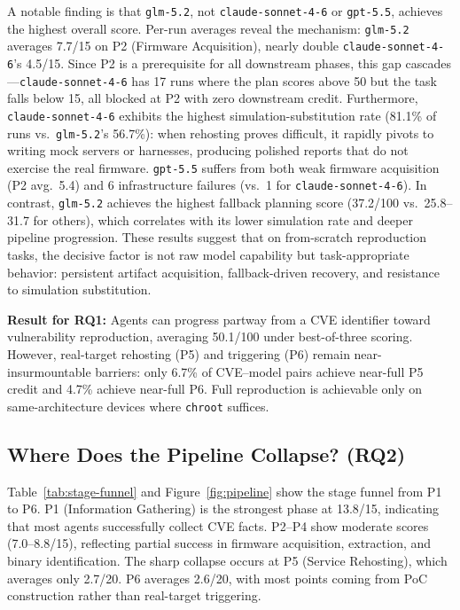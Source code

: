 A notable finding is that \texttt{glm-5.2}, not \texttt{claude-sonnet-4-6} or \texttt{gpt-5.5}, achieves the highest overall score. Per-run averages reveal the mechanism: \texttt{glm-5.2} averages 7.7/15 on P2 (Firmware Acquisition), nearly double \texttt{claude-sonnet-4-6}'s 4.5/15. Since P2 is a prerequisite for all downstream phases, this gap cascades---\texttt{claude-sonnet-4-6} has 17 runs where the plan scores above 50 but the task falls below 15, all blocked at P2 with zero downstream credit. Furthermore, \texttt{claude-sonnet-4-6} exhibits the highest simulation-substitution rate (81.1\% of runs vs.\ \texttt{glm-5.2}'s 56.7\%): when rehosting proves difficult, it rapidly pivots to writing mock servers or harnesses, producing polished reports that do not exercise the real firmware. \texttt{gpt-5.5} suffers from both weak firmware acquisition (P2 avg.\ 5.4) and 6 infrastructure failures (vs.\ 1 for \texttt{claude-sonnet-4-6}). In contrast, \texttt{glm-5.2} achieves the highest fallback planning score (37.2/100 vs.\ 25.8--31.7 for others), which correlates with its lower simulation rate and deeper pipeline progression. These results suggest that on from-scratch reproduction tasks, the decisive factor is not raw model capability but task-appropriate behavior: persistent artifact acquisition, fallback-driven recovery, and resistance to simulation substitution.

\begin{mdframed}[linecolor=black,linewidth=1pt,backgroundcolor=gray!10,roundcorner=3pt,nobreak=true]
\noindent\textbf{Result for RQ1:} Agents can progress partway from a CVE identifier toward vulnerability reproduction, averaging 50.1/100 under best-of-three scoring. However, real-target rehosting (P5) and triggering (P6) remain near-insurmountable barriers: only 6.7\% of CVE--model pairs achieve near-full P5 credit and 4.7\% achieve near-full P6. Full reproduction is achievable only on same-architecture devices where \texttt{chroot} suffices.
\end{mdframed}

\subsection{Where Does the Pipeline Collapse? (RQ2)}
Table~\ref{tab:stage-funnel} and Figure~\ref{fig:pipeline} show the stage funnel from P1 to P6. P1 (Information Gathering) is the strongest phase at 13.8/15, indicating that most agents successfully collect CVE facts. P2--P4 show moderate scores (7.0--8.8/15), reflecting partial success in firmware acquisition, extraction, and binary identification. The sharp collapse occurs at P5 (Service Rehosting), which averages only 2.7/20. P6 averages 2.6/20, with most points coming from PoC construction rather than real-target triggering.

